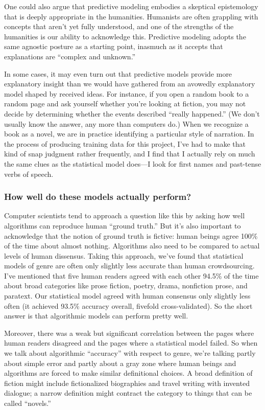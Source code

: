 \documentclass[paper=a4, fontsize=12pt]{scrartcl}
\numberwithin{equation}{section}		%
\numberwithin{figure}{section}			%
\numberwithin{table}{section}				%
\begin{document}
One could also argue that predictive modeling embodies a skeptical epistemology that is deeply appropriate in the humanities. Humanists are often grappling with concepts that aren't yet fully understood, and one of the strengths of the humanities is our ability to acknowledge this. Predictive modeling adopts the same agnostic posture as a starting point, inasmuch as it accepts that explanations are ``complex and unknown.''

In some cases, it may even turn out that predictive models provide more explanatory insight than we would have gathered from an avowedly explanatory model shaped by received ideas. For instance, if you open a random book to a random page and ask yourself whether you're looking at fiction, you may not decide by determining whether the events described ``really happened.'' (We don't usually know the answer, any more than computers do.) When we recognize a book as a novel, we are in practice identifying a particular style of narration. In the process of producing training data for this project, I've had to make that kind of snap judgment rather frequently, and I find that I actually rely on much the same clues as the statistical model does---I look for first names and past-tense verbs of speech.

\subsubsection{How well do these models actually perform?}

Computer scientists tend to approach a question like this by asking how well algorithms can reproduce human ``ground truth.'' But it's also important to acknowledge that the notion of ground truth is fictive: human beings agree 100\% of the time about almost nothing. Algorithms also need to be compared to actual levels of human dissensus. Taking this approach, we've found that statistical models of genre are often only slightly less accurate than human crowdsourcing. I've mentioned that five human readers agreed with each other 94.5\% of the time about broad categories like prose fiction, poetry, drama, nonfiction prose, and paratext. Our statistical model agreed with human consensus only slightly less often (it achieved 93.5\% accuracy overall, fivefold cross-validated). So the short answer is that algorithmic models can perform pretty well.

Moreover, there was a weak but significant correlation between the pages where human readers disagreed and the pages where a statistical model failed. So when we talk about algorithmic ``accuracy'' with respect to genre, we're talking partly about simple error and partly about a gray zone where human beings and algorithms are forced to make similar definitional choices. A broad definition of fiction might include fictionalized biographies and travel writing with invented dialogue; a narrow definition might contract the category to things that can be called ``novels.''
\end{document}
